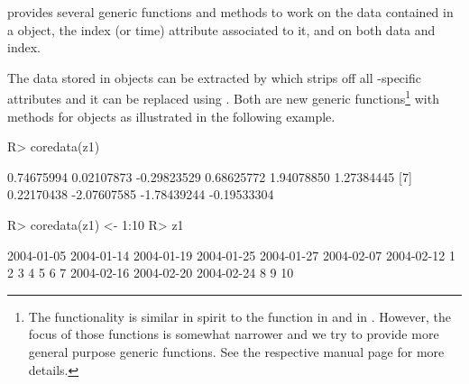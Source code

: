 \documentclass{Z}
\begin{document}
 provides several generic functions and methods
to work on the data contained in a  object, the
index (or time) attribute associated to it, and on both data and
index.

The data stored in  objects can be extracted by
 which strips off all -specific attributes and 
it can be replaced using . Both are new generic
functions\footnote{The  functionality is similar in spirit to the 
function in  and  in . However, the 
focus of those functions is somewhat narrower and we try to provide 
more general purpose generic functions. See the respective manual
page for more details.}
with methods for  objects as illustrated in the following
example.
\begin{Schunk}
\begin{Sinput}
R> coredata(z1)
\end{Sinput}
\begin{Soutput}
 [1]  0.74675994  0.02107873 -0.29823529  0.68625772  1.94078850  1.27384445
 [7]  0.22170438 -2.07607585 -1.78439244 -0.19533304
\end{Soutput}
\begin{Sinput}
R> coredata(z1) <- 1:10
R> z1
\end{Sinput}
\begin{Soutput}
2004-01-05 2004-01-14 2004-01-19 2004-01-25 2004-01-27 2004-02-07 2004-02-12 
         1          2          3          4          5          6          7 
2004-02-16 2004-02-20 2004-02-24 
         8          9         10 
\end{Soutput}
\end{Schunk}
\end{document}
